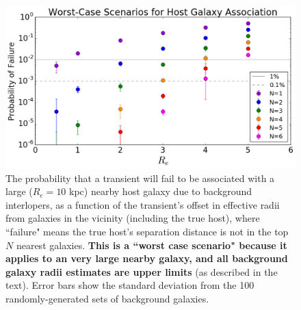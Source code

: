 \begin{figure}[h]
\begin{center}
\includegraphics[width=12cm]{hg_P_vs_Re.png}
\caption{The probability that a transient will fail to be associated with a large ($R_e=10$ kpc) nearby host galaxy due to background interlopers, as a function of the transient's offset in effective radii from galaxies in the vicinity (including the true host), where ``failure" means the true host's separation distance is not in the top $N$ nearest galaxies. \textbf{This is a ``worst case scenario" because it applies to an very large nearby galaxy, and all background galaxy radii estimates are upper limits} (as described in the text). Error bars show the standard deviation from the 100 randomly-generated sets of background galaxies. \label{fig:pfail}}
\end{center}
\end{figure}
